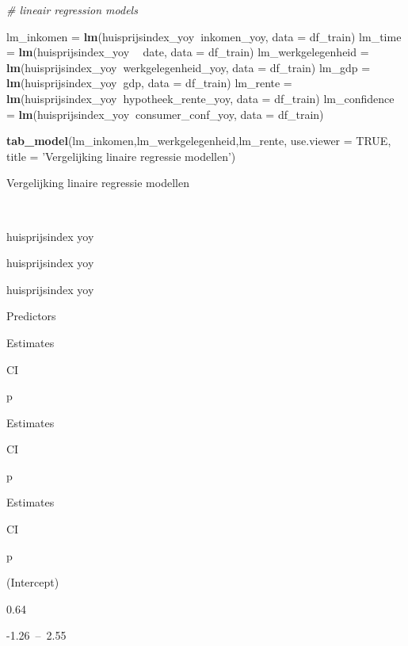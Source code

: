 \documentclass[
]{article}
\newenvironment{Shaded}{\begin{snugshade}}{\end{snugshade}}
\newcommand{\CommentTok}[1]{\textcolor[rgb]{0.56,0.35,0.01}{\textit{#1}}}
\newcommand{\DataTypeTok}[1]{\textcolor[rgb]{0.13,0.29,0.53}{#1}}
\newcommand{\KeywordTok}[1]{\textcolor[rgb]{0.13,0.29,0.53}{\textbf{#1}}}
\newcommand{\NormalTok}[1]{#1}
\newcommand{\OperatorTok}[1]{\textcolor[rgb]{0.81,0.36,0.00}{\textbf{#1}}}
\newcommand{\OtherTok}[1]{\textcolor[rgb]{0.56,0.35,0.01}{#1}}
\newcommand{\StringTok}[1]{\textcolor[rgb]{0.31,0.60,0.02}{#1}}
\begin{document}
\begin{Shaded}
\begin{Highlighting}[]
\CommentTok{# lineair regression models}

\NormalTok{lm_inkomen         =}\StringTok{ }\KeywordTok{lm}\NormalTok{(huisprijsindex_yoy}\OperatorTok{~}\NormalTok{inkomen_yoy, }\DataTypeTok{data =}\NormalTok{ df_train) }
\NormalTok{lm_time            =}\StringTok{ }\KeywordTok{lm}\NormalTok{(huisprijsindex_yoy }\OperatorTok{~}\StringTok{ }\NormalTok{date, }\DataTypeTok{data =}\NormalTok{ df_train)}
\NormalTok{lm_werkgelegenheid =}\StringTok{ }\KeywordTok{lm}\NormalTok{(huisprijsindex_yoy}\OperatorTok{~}\NormalTok{werkgelegenheid_yoy, }\DataTypeTok{data =}\NormalTok{ df_train) }
\NormalTok{lm_gdp             =}\StringTok{ }\KeywordTok{lm}\NormalTok{(huisprijsindex_yoy}\OperatorTok{~}\NormalTok{gdp, }\DataTypeTok{data =}\NormalTok{ df_train) }
\NormalTok{lm_rente           =}\StringTok{ }\KeywordTok{lm}\NormalTok{(huisprijsindex_yoy}\OperatorTok{~}\NormalTok{hypotheek_rente_yoy, }\DataTypeTok{data =}\NormalTok{ df_train) }
\NormalTok{lm_confidence      =}\StringTok{ }\KeywordTok{lm}\NormalTok{(huisprijsindex_yoy}\OperatorTok{~}\NormalTok{consumer_conf_yoy, }\DataTypeTok{data =}\NormalTok{ df_train) }

\KeywordTok{tab_model}\NormalTok{(lm_inkomen,lm_werkgelegenheid,lm_rente,}
          \DataTypeTok{use.viewer =} \OtherTok{TRUE}\NormalTok{,}
          \DataTypeTok{title =} \StringTok{'Vergelijking linaire regressie modellen'}\NormalTok{) }
\end{Highlighting}
\end{Shaded}

Vergelijking linaire regressie modellen

~

huisprijsindex yoy

huisprijsindex yoy

huisprijsindex yoy

Predictors

Estimates

CI

p

Estimates

CI

p

Estimates

CI

p

(Intercept)

0.64

-1.26~--~2.55
\end{document}
